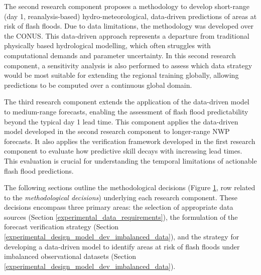 \begin{figure}[htbp]
\label{fig:integrated_experimental_strategy}
\end{figure}

The  second research component proposes a methodology to develop short-range (day 1, reanalysis-based) hydro-meteorological, data-driven predictions of areas at risk of flash floods. Due to data limitations, the methodology was developed over the CONUS. This data-driven approach represents a departure from traditional physically based hydrological modelling, which often struggles with computational demands and parameter uncertainty. In this second research component, a sensitivity analysis is also performed to assess which data strategy would be most suitable for extending the regional training globally, allowing predictions to be computed over a continuous global domain.

The  third research component extends the application of the data-driven model to medium-range forecasts, enabling the assessment of flash flood predictability beyond the typical day 1 lead time. This component applies the data-driven model developed in the second research component to longer-range NWP forecasts. It also applies the verification framework developed in the first research component to evaluate how predictive skill decays with increasing lead times. This evaluation is crucial for understanding the temporal limitations of actionable flash flood predictions.

The following sections outline the methodological decisions (Figure \ref{fig:integrated_experimental_strategy}, row related to the \textit{methodological decisions}) underlying each research component. These decisions encompass three primary areas: the selection of appropriate data sources (Section \ref{experimental_data_requirements}), the formulation of the forecast verification strategy (Section \ref{experimental_design_model_dev_imbalanced_data}), and the strategy for developing a data-driven model to identify areas at risk of flash floods under imbalanced observational datasets (Section \ref{experimental_design_model_dev_imbalanced_data}). 


